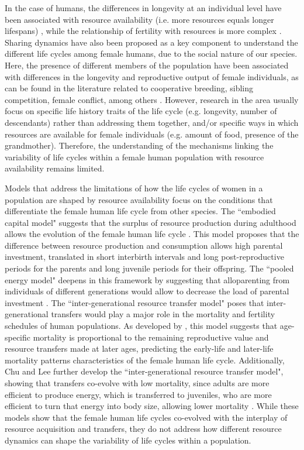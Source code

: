 \documentclass{article}
\begin{document}
In the case of humans, the differences in longevity at an individual level have been associated with resource availability (i.e. more resources equals longer lifespans) \citep{kaplan2003embodied}, while the relationship of fertility with resources is more complex \citep{mulder1998demographic,sear2016understanding}. Sharing dynamics have also been proposed as a key component to understand the different life cycles among female humans, due to the social nature of our species. Here, the presence of different members of the population have been associated with differences in the longevity and reproductive output of female individuals, as can be found in the literature related to cooperative breeding, sibling competition, female conflict, among others \citep{ivey2000cooperative,nitsch2013elder,mace2012female,sear2011much}. However, research in the area usually focus on specific life history traits of the life cycle (e.g. longevity, number of descendants) rather than addressing them together, and/or specific ways in which resources are available for female individuals (e.g. amount of food, presence of the grandmother). Therefore, the understanding of the mechanisms linking the variability of life cycles within a female human population with resource availability remains limited.

Models that address the limitations of how the life cycles of women in a population are shaped by resource availability focus on the conditions that differentiate the female human life cycle from other species. The ``embodied capital model" suggests that the surplus of resource production during adulthood allows the evolution of the female human life cycle \citep{kaplan2000theory}. This model proposes that the difference between resource production and consumption allows high parental investment, translated in short interbirth intervals and long post-reproductive periods for the parents and long juvenile periods for their offspring. The ``pooled energy model" deepens in this framework by suggesting that alloparenting from individuals of different generations would allow to decrease the load of parental investment \citep{kramer2010pooled}. The ``inter-generational resource transfer model" poses that inter-generational transfers would play a major role in the mortality and fertility schedules of human populations. As developed by \cite{lee2003rethinking}, this model suggests that age-specific mortality is proportional to the remaining reproductive value and resource transfers made at later ages, predicting the early-life and later-life mortality patterns characteristics of the female human life cycle. Additionally, Chu and Lee further develop the ``inter-generational resource transfer model", showing that transfers co-evolve with low mortality, since adults are more efficient to produce energy, which is transferred to juveniles, who are more efficient to turn that energy into body size, allowing lower mortality \citep{chu2006co}. While these models show that the female human life cycles co-evolved with the interplay of resource acquisition and transfers, they do not address how different resource dynamics can shape the variability of life cycles within a population.
\end{document}
